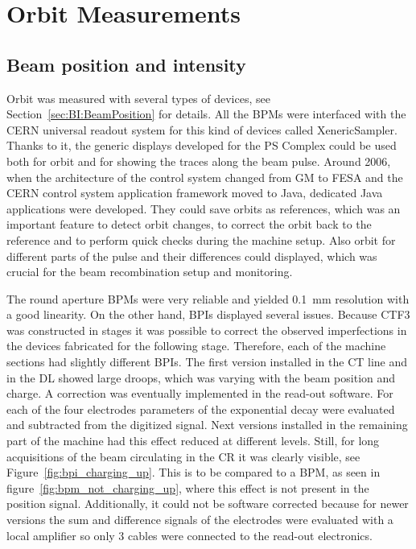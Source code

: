 \section{Orbit Measurements}
\subsection{Beam position and intensity}
\label{sec.02_OrbitMeas}

Orbit was measured with several types of devices, 
see Section~\ref{sec:BI:BeamPosition} for details.
All the BPMs were interfaced with the CERN universal readout system for this kind of devices called XenericSampler.
Thanks to it, the generic displays developed for the PS Complex could be used
both for orbit and for showing the traces along the beam pulse. 
Around 2006, when the architecture of the control system changed from GM to FESA
and the CERN control system application framework moved to Java,
dedicated Java applications were developed. 
They could save orbits as references, which was an important feature to detect orbit changes,
to correct the orbit back to the reference and to perform quick checks during the machine setup.
Also orbit for different parts of the pulse and their differences could displayed,
which was crucial for the beam recombination setup and monitoring. 

The round aperture BPMs were very reliable and yielded 0.1~mm resolution with a good linearity.
On the other hand, BPIs displayed several issues.
Because CTF3 was constructed in stages it was possible to correct the observed imperfections
in the devices fabricated for the following stage. Therefore, each of the machine sections
had slightly different BPIs.
The first version installed in the CT line and in the DL
showed large droops, which was varying with the beam position and charge.
A correction was eventually implemented in the read-out software.
For each of the four electrodes parameters of the exponential decay were
evaluated and subtracted from the digitized signal. 
Next versions installed in the remaining part of the machine had this effect reduced at different levels. 
Still, for long acquisitions of the beam circulating in the CR 
it was clearly visible, see Figure~\ref{fig:bpi_charging_up}. 
This is to be compared to a BPM, as seen in figure~\ref{fig:bpm_not_charging_up}, 
where this effect is not present in the position signal. 
Additionally, it could not be software corrected because 
for newer versions the sum and difference signals of the electrodes
were evaluated with a local amplifier
so only 3 cables were connected to the read-out electronics. 


